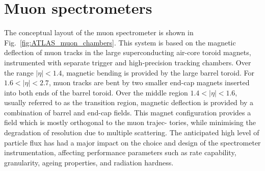 \section{Muon spectrometers}
\label{sec:ATLAS_muon_chambers}

\begin{figure}[htb]
\end{figure}


The conceptual layout of the muon spectrometer is shown in Fig.~\ref{fig:ATLAS_muon_chambers}. This system is based on the magnetic
deflection of muon tracks in the large superconducting air-core toroid magnets, instrumented with
separate trigger and high-precision tracking chambers. Over the range $|\eta| < 1.4$, magnetic bending
is provided by the large barrel toroid. For $1.6 < |\eta| < 2.7$, muon tracks are bent by two smaller
end-cap magnets inserted into both ends of the barrel toroid. Over the middle region $1.4 < |\eta| < 1.6$, usually referred
to as the transition region, magnetic deflection is provided by a combination of barrel and end-cap
fields. This magnet configuration provides a field which is mostly orthogonal to the muon trajec-
tories, while minimising the degradation of resolution due to multiple scattering. The anticipated
high level of particle flux has had a major impact on the choice and design of the spectrometer instrumentation,
affecting performance parameters such as rate capability, granularity, ageing
properties, and radiation hardness.

